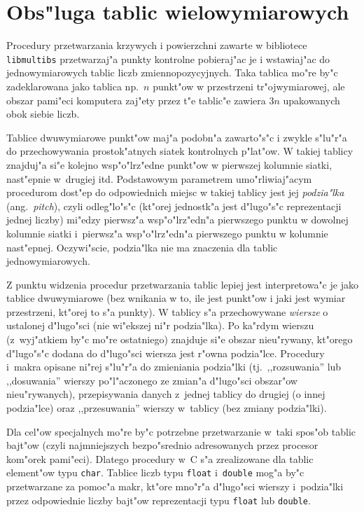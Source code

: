 \newpage
\section{Obs"luga tablic wielowymiarowych}

Procedury przetwarzania krzywych i powierzchni zawarte w bibliotece
\texttt{libmultibs} przetwarzaj"a punkty kontrolne
pobieraj"ac je i wstawiaj"ac do jednowymiarowych tablic liczb
zmiennopozycyjnych. Taka tablica mo"re by"c zadeklarowana jako tablica np.\
$n$ punkt"ow w przestrzeni tr"ojwymiarowej, ale obszar pami"eci komputera
zaj"ety przez t"e tablic"e zawiera $3n$ upakowanych obok siebie liczb.

Tablice dwuwymiarowe punkt"ow maj"a podobn"a zawarto"s"c i zwykle s"lu"r"a
do przechowywania prostok"atnych siatek kontrolnych p"lat"ow. W takiej
tablicy znajduj"a si"e kolejno wsp"o"lrz"edne punkt"ow w pierwszej kolumnie
siatki, nast"epnie w~drugiej itd. Podstawowym parametrem umo"rliwiaj"acym
procedurom dost"ep do odpowiednich miejsc w takiej tablicy jest jej
\emph{podzia"lka} (ang.~\textsl{pitch}), czyli odleg"lo"s"c (kt"orej
jednostk"a jest d"lugo"s"c reprezentacji jednej liczby)
mi"edzy pierwsz"a wsp"o"lrz"edn"a pierwszego punktu w dowolnej kolumnie
siatki i~pierwsz"a wsp"o"lrz"edn"a pierwszego punktu w kolumnie nast"epnej.
Oczywi"scie, podzia"lka nie ma znaczenia dla tablic jednowymiarowych.

Z punktu widzenia procedur przetwarzania tablic lepiej jest interpretowa"c
je jako tablice dwuwymiarowe (bez wnikania w to, ile jest punkt"ow i jaki
jest wymiar przestrzeni, kt"orej to s"a punkty). W tablicy s"a przechowywane
\emph{wiersze} o ustalonej d"lugo"sci (nie wi"ekszej ni"r podzia"lka). Po
ka"rdym wierszu (z~wyj"atkiem by"c mo"re ostatniego) znajduje si"e obszar
nieu"rywany, kt"orego d"lugo"s"c dodana do d"lugo"sci wiersza jest r"owna
podzia"lce. Procedury i~makra opisane ni"rej s"lu"r"a do zmieniania
podzia"lki (tj.\ ,,rozsuwania'' lub ,,dosuwania'' wierszy po"l"aczonego ze
zmian"a d"lugo"sci obszar"ow nieu"rywanych), przepisywania danych z~jednej
tablicy do drugiej (o innej podzia"lce) oraz ,,przesuwania'' wierszy
w~tablicy (bez zmiany podzia"lki).

Dla cel"ow specjalnych mo"re by"c potrzebne przetwarzanie w~taki spos"ob
tablic bajt"ow (czyli najmniejszych bezpo"srednio adresowanych przez procesor
kom"orek pami"eci). Dlatego procedury w~C s"a zrealizowane dla tablic
element"ow typu \texttt{char}. Tablice liczb typu \texttt{float}
i~\texttt{double} mog"a by"c przetwarzane za pomoc"a makr, kt"ore mno"r"a
d"lugo"sci wierszy i~podzia"lki przez odpowiednie liczby bajt"ow
reprezentacji typu \texttt{float} lub \texttt{double}.

